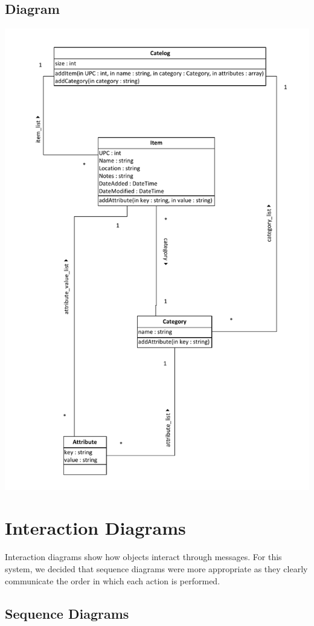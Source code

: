 \documentclass{article}
\begin{document}
\subsection{Diagram}
\includegraphics[keepaspectratio, width=6in]{class_diagram.pdf}\\

\section{Interaction Diagrams}
Interaction diagrams show how objects interact through messages.  For this system, we decided that sequence diagrams were more appropriate as they clearly communicate the order in which each action is performed.

\subsection{Sequence Diagrams}
\end{document}
